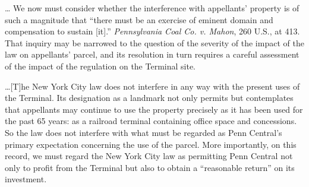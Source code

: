 


\ldots
We now must consider whether the interference with appellants' property is of
such a magnitude that ``there must be an exercise of eminent domain and
compensation to sustain [it].'' \textit{Pennsylvania Coal Co. v. Mahon}, 260
U.S., at 413. That inquiry may be narrowed to the question of the severity of
the impact of the law on appellants' parcel, and its resolution in turn requires
a careful assessment of the impact of the regulation on the Terminal site.

\ldots [T]he New York City law does not interfere in any way with the present
uses of the Terminal. Its designation as a landmark not only permits but
contemplates that appellants may continue to use the property precisely as it
has been used for the past 65 years: as a railroad terminal containing office
space and concessions. So the law does not interfere with what must be regarded
as Penn Central's primary expectation concerning the use of the parcel. More
importantly, on this record, we must regard the New York City law as permitting
Penn Central not only to profit from the Terminal but also to obtain a
``reasonable return'' on its investment.

